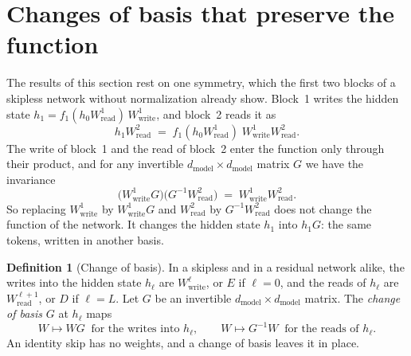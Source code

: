 \documentclass[10pt]{article}
\theoremstyle{definition}
\newtheorem{definition}[theorem]{Definition}
\theoremstyle{remark}
\newcommand{\Wread}{W_{\mathrm{read}}}
\newcommand{\Wwrite}{W_{\mathrm{write}}}
\newcommand{\dm}{d_{\mathrm{model}}}
\begin{document}
\section{Changes of basis that preserve the function}\label{sec:reduce}\label{sec:gauge}

The results of this section rest on one symmetry, which the first two blocks of a skipless network without normalization already show. Block~1 writes the hidden state $h_1 = f_1(h_0\Wread^{1})\,\Wwrite^{1}$, and block~2 reads it as
\begin{equation}\label{eq:product}
h_1\Wread^{2} \;=\; f_1(h_0\Wread^{1})\;\Wwrite^{1}\Wread^{2}.
\end{equation}
The write of block~1 and the read of block~2 enter the function only through their product, and for any invertible $\dm\times\dm$ matrix $G$ we have the invariance
\begin{equation}\label{eq:invariance}
\big(\Wwrite^{1}G\big)\big(G^{-1}\Wread^{2}\big) \;=\; \Wwrite^{1}\Wread^{2}.
\end{equation}
So replacing $\Wwrite^{1}$ by $\Wwrite^{1}G$ and $\Wread^{2}$ by $G^{-1}\Wread^{2}$ does not change the function of the network. It changes the hidden state $h_1$ into $h_1G$: the same tokens, written in another basis.

\begin{definition}[Change of basis]\label{def:cob}
In a skipless and in a residual network alike, the writes into the hidden state $h_\ell$ are $\Wwrite^{\ell}$, or $E$ if $\ell = 0$, and the reads of $h_\ell$ are $\Wread^{\ell+1}$, or $D$ if $\ell = L$. Let $G$ be an invertible $\dm\times\dm$ matrix. The \emph{change of basis} $G$ at $h_\ell$ maps
\begin{equation}\label{eq:cob}
W \mapsto WG \ \text{ for the writes into } h_\ell, \qquad W \mapsto G^{-1}W \ \text{ for the reads of } h_\ell.
\end{equation}
An identity skip has no weights, and a change of basis leaves it in place.
\end{definition}
\end{document}
